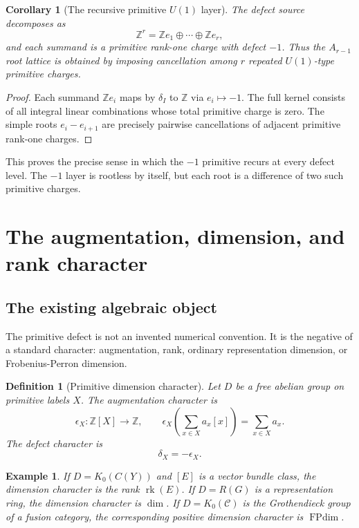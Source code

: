 \documentclass[11pt]{article}
\newtheorem{corollary}[theorem]{Corollary}
\newtheorem{definition}[theorem]{Definition}
\newtheorem{example}[theorem]{Example}
\newcommand{\ZZ}{\mathbb Z}
\begin{document}
\begin{corollary}[The recursive primitive $U(1)$ layer]
The defect source decomposes as
\[
        \ZZ^r=\ZZ e_1\oplus\cdots\oplus\ZZ e_r,
\]
and each summand is a primitive rank-one charge with defect $-1$.  Thus the $A_{r-1}$ root lattice is obtained by imposing cancellation among $r$ repeated $U(1)$-type primitive charges.
\end{corollary}

\begin{proof}
Each summand $\ZZ e_i$ maps by $\delta_I$ to $\ZZ$ via $e_i\mapsto -1$.  The full kernel consists of all integral linear combinations whose total primitive charge is zero.  The simple roots $e_i-e_{i+1}$ are precisely pairwise cancellations of adjacent primitive rank-one charges.
\end{proof}

This proves the precise sense in which the $-1$ primitive recurs at every defect level.  The $-1$ layer is rootless by itself, but each root is a difference of two such primitive charges.

\section{The augmentation, dimension, and rank character}

\subsection{The existing algebraic object}

The primitive defect is not an invented numerical convention.  It is the negative of a standard character: augmentation, rank, ordinary representation dimension, or Frobenius-Perron dimension.

\begin{definition}[Primitive dimension character]
Let $D$ be a free abelian group on primitive labels $X$.  The augmentation character is
\[
        \epsilon_X:\ZZ[X]\to\ZZ,
        \qquad
        \epsilon_X\left(\sum_{x\in X}a_x[x]\right)=\sum_{x\in X}a_x.
\]
The defect character is
\[
        \delta_X=-\epsilon_X.
\]
\end{definition}

\begin{example}
If $D=K_0(C(Y))$ and $[E]$ is a vector bundle class, the dimension character is the rank $\operatorname{rk}(E)$.  If $D=R(G)$ is a representation ring, the dimension character is $\dim$.  If $D=K_0(\mathcal C)$ is the Grothendieck group of a fusion category, the corresponding positive dimension character is $\operatorname{FPdim}$.
\end{example}
\end{document}
